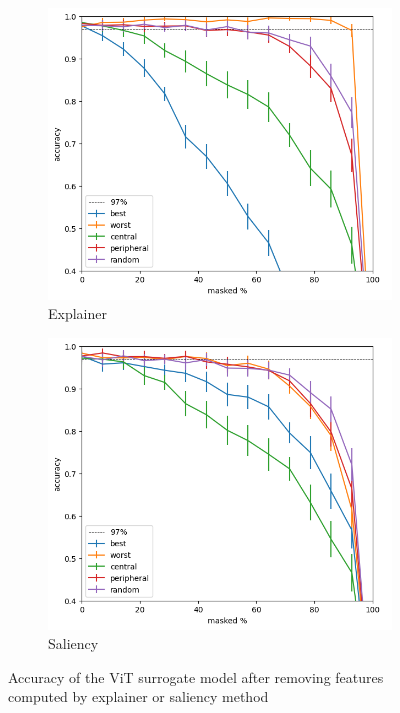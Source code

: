 \documentclass[magisterska,en]{pracamgr}
\begin{document}
\iftrue




\begin{figure}
\centering
\begin{subfigure}{.6\textwidth}
  \centering
  \includegraphics[width=.6\linewidth]{./images/masking_explainer_patches_accuracy_half-0.png}
  \caption{Explainer}
  \label{fig:sub1}
\end{subfigure}%
\begin{subfigure}{.6\textwidth}
  \centering
  \includegraphics[width=.6\linewidth]
{./images/masking_saliency_patches_accuracy_vit_half-0.png}
  \caption{Saliency}
  \label{fig:sub2}
\end{subfigure}
\caption{Accuracy of the ViT surrogate model after removing features computed by explainer or saliency method}
\label{fig:ViT_Saliency_Explainer_CIFAR}
\end{figure}
\end{document}
